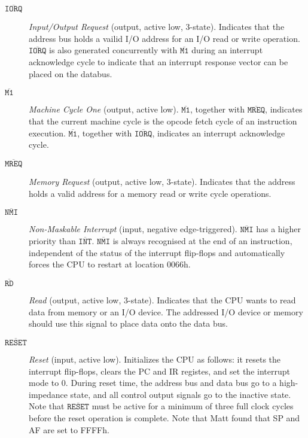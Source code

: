 \documentclass[oneside,a4paper]{book}
\begin{document}
\begin{description}
\item[$\mathtt{\overline{IORQ}}$]
  {\em Input/Output Request} (output, active low, 3-state). Indicates that
  the address bus holds a vailid I/O address for an I/O read or write 
  operation. $\mathtt{\overline{IORQ}}$ is also generated concurrently with
  $\mathtt{\overline{M1}}$ during an interrupt acknowledge cycle to indicate
  that an interrupt response vector can be placed on the databus.

\item[$\mathtt{\overline{M1}}$]
  {\em Machine Cycle One} (output, active low). $\mathtt{\overline{M1}}$,
  together with $\mathtt{\overline{MREQ}}$, indicates that the current 
  machine cycle is the opcode fetch cycle of an instruction execution.
  $\mathtt{\overline{M1}}$, together with $\mathtt{\overline{IORQ}}$,
  indicates an interrupt acknowledge cycle.

\item[$\mathtt{\overline{MREQ}}$]
  {\em Memory Request} (output, active low, 3-state). Indicates that the
  address holds a valid address for a memory read or write cycle operations.

\item[$\mathtt{\overline{NMI}}$]
  {\em Non-Maskable Interrupt} (input, negative edge-triggered). 
  $\mathtt{\overline{NMI}}$ has a higher priority than 
  $\mathtt{\overline{INT}}$. $\mathtt{\overline{NMI}}$ is always recognised 
  at the end of an instruction, independent of the status of the 
  interrupt flip-flops and automatically forces the CPU to restart at 
  location 0066h.

\item[$\mathtt{\overline{RD}}$]
  {\em Read} (output, active low, 3-state). Indicates that the 
  CPU wants to read data from memory or an I/O device. The addressed I/O device
  or memory should use this signal to place data onto the data bus.

\item[$\mathtt{\overline{RESET}}$]
  {\em Reset} (input, active low). Initializes the CPU as follows: it resets
  the interrupt flip-flops, clears the PC and IR registes, and set the 
  interrupt mode to 0. During reset time, the address bus and data bus go
  to a high-impedance state, and all control output signals go to 
  the inactive state. Note that $\mathtt{\overline{RESET}}$ must be active
  for a minimum of three full clock cycles before the reset operation is
  complete. Note that Matt found that SP and AF are set to FFFFh.
  

\end{description}
\end{document}
